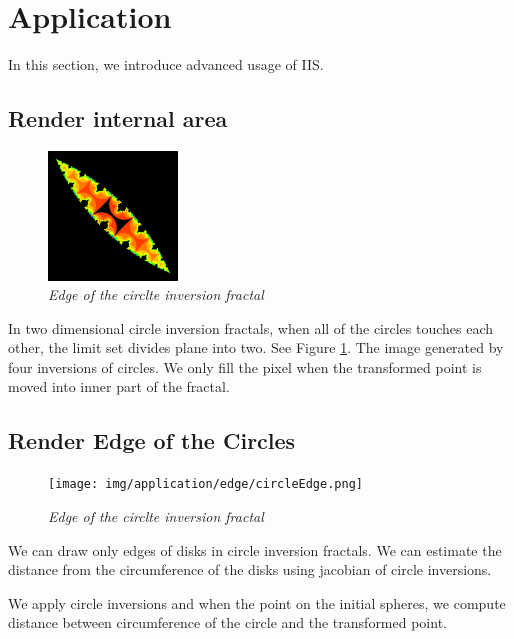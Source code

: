 
\section{Application}

In this section, we introduce advanced usage of IIS.

\subsection{Render internal area}

\begin{figure}[htbp]
  \center
  \includegraphics[height=1.35in, keepaspectratio]{img/application/internal/schottky.png}
  \caption{\textit{Edge of the circlte inversion fractal}}
  \label{fig:divideTwo}
 \hspace*{\fill}
\end{figure}

In two dimensional circle inversion fractals,
when all of the circles touches each other, the limit set divides plane
into two. See Figure \ref{fig:divideTwo}.
The image generated by four inversions of circles.
We only fill the pixel when the transformed point is moved into
inner part of the fractal.

\subsection{Render Edge of the Circles}

\begin{figure}[htbp]
  \center
  \texttt{[image: img/application/edge/circleEdge.png]}
  \caption{\textit{Edge of the circlte inversion fractal}}
  \label{fig:circleEdge}
 \hspace*{\fill}
\end{figure}

We can draw only edges of disks in circle inversion fractals.
We can estimate the distance from the circumference of the disks using jacobian
of circle inversions.

We apply circle inversions and when the point on the initial spheres,
we compute distance between circumference of the circle and the
transformed point.

